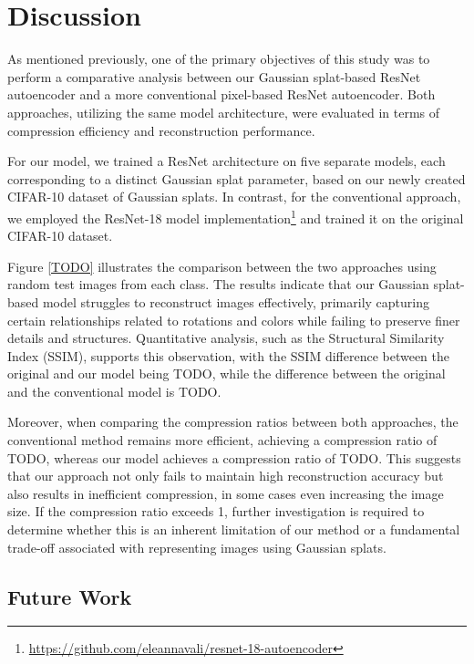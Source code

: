 \section{Discussion}
\label{sec:discussion}

As mentioned previously, one of the primary objectives of this study was to perform a comparative analysis between our Gaussian splat-based ResNet autoencoder and a more conventional pixel-based ResNet autoencoder. Both approaches, utilizing the same model architecture, were evaluated in terms of compression efficiency and reconstruction performance.

For our model, we trained a ResNet architecture on five separate models, each corresponding to a distinct Gaussian splat parameter, based on our newly created CIFAR-10 dataset of Gaussian splats. In contrast, for the conventional approach, we employed the ResNet-18 model implementation\footnote{\url{https://github.com/eleannavali/resnet-18-autoencoder}} and trained it on the original CIFAR-10 dataset.

Figure \ref{TODO} illustrates the comparison between the two approaches using random test images from each class. The results indicate that our Gaussian splat-based model struggles to reconstruct images effectively, primarily capturing certain relationships related to rotations and colors while failing to preserve finer details and structures. Quantitative analysis, such as the Structural Similarity Index (SSIM), supports this observation, with the SSIM difference between the original and our model being TODO, while the difference between the original and the conventional model is TODO.

Moreover, when comparing the compression ratios between both approaches, the conventional method remains more efficient, achieving a compression ratio of TODO, whereas our model achieves a compression ratio of TODO. This suggests that our approach not only fails to maintain high reconstruction accuracy but also results in inefficient compression, in some cases even increasing the image size. If the compression ratio exceeds 1, further investigation is required to determine whether this is an inherent limitation of our method or a fundamental trade-off associated with representing images using Gaussian splats.

\subsection{Future Work}

